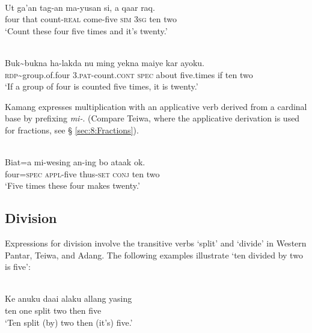 \ea
\label{ex:8:1244}
\\ 
 \gll   Ut  ga'an  tag-an  ma-yusan  si,  a   qaar raq.  \\
    four  that   count-\textsc{real } come-five  \textsc{sim}  \textsc{3sg} ten two  \\
 \glt `Count these four five times and it's twenty.'
\z



\ea
\label{ex:8:1245}
\\ 
 \gll Buk\~{}bukna  ha-lakda  nu  ming  yekna  maiye  kar ayoku. \\
  \textsc{rdp}\~{}group.of.four  \textsc{3.pat}-count.\textsc{cont}  \textsc{spec}  about  five.times  if  ten two  \\
 \glt  `If a group of four is counted five times, it is twenty.'
\z

 

Kamang expresses multiplication with an applicative verb derived from a cardinal base by prefixing \textit{mi-}. (Compare Teiwa, where the applicative derivation is used for fractions, see {\S} \ref{sec:8:Fractions}). 




\ea%
\label{bkm:Ref358043179}
\\
\gll   Biat=a  mi-wesing  an-ing  bo  ataak   ok.  \\  
    four=\textsc{spec}  \textsc{appl-}five  thus\textsc{-set}  \textsc{conj} ten  two   \\
\glt  `Five times these four makes twenty.'
\z


\subsection{Division}
\label{sec:8:Division}
Expressions for division involve the transitive verbs `split' and `divide' in Western Pantar, Teiwa, and Adang. The following examples illustrate `ten divided by two is five': 


\ea%
\label{bkm:Ref342664493}
\\
 
\gll   Ke anuku  daai  alaku  allang  yasing\\  
    ten one  split  two  then  five \\
\glt `Ten split (by) two then (it's) five.'
\z



